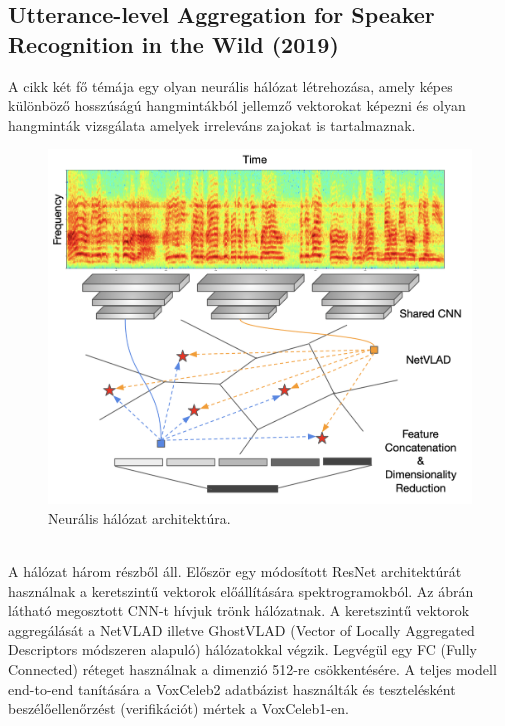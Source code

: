 \newpage

\subsection{Utterance-level Aggregation for Speaker Recognition in the Wild (2019)}

A cikk két fő témája egy olyan neurális hálózat létrehozása, amely képes különböző hosszúságú hangmintákból jellemző vektorokat képezni és olyan hangminták vizsgálata amelyek irreleváns zajokat is tartalmaznak.

\begin{figure}[!ht]
	\centering
	\includegraphics[width=150mm, keepaspectratio]{figures/frame-cnn.png}
	\caption{Neurális hálózat architektúra.}
	\label{fig:frame-cnn}
\end{figure}
\ \\
\newline
\newline
A hálózat három részből áll. Először egy módosított ResNet architektúrát használnak a keretszintű vektorok előállítására spektrogramokból. Az ábrán látható megosztott CNN-t hívjuk trönk hálózatnak. A keretszintű vektorok aggregálását a NetVLAD illetve GhostVLAD (Vector of Locally Aggregated Descriptors módszeren alapuló) hálózatokkal végzik. Legvégül egy FC (Fully Connected) réteget használnak a dimenzió 512-re csökkentésére.
\newline
\newline
A teljes modell end-to-end tanítására a VoxCeleb2 adatbázist használták és tesztelésként beszélőellenőrzést (verifikációt) mértek a VoxCeleb1-en.
